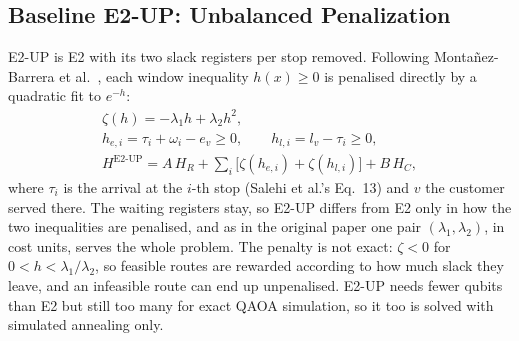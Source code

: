 \subsection{Baseline E2-UP: Unbalanced Penalization}\label{sec:e2up}
E2-UP is E2 with its two slack registers per stop removed. Following Montañez-Barrera et
al.~\cite{montanezbarrera2024unbalanced}, each window inequality $h(x)\ge0$ is penalised directly
by a quadratic fit to $e^{-h}$:
\begin{gather}
  \zeta(h) = -\lambda_1 h + \lambda_2 h^2, \label{eq:up}\\
  h_{e,i} = \tau_i + \omega_i - e_{v} \ge 0, \qquad h_{l,i} = l_{v} - \tau_i \ge 0, \label{eq:uph}\\
  H^{\mathrm{E2\text{-}UP}} = A\,H_R + \sum_{i}\bigl[\zeta(h_{e,i}) + \zeta(h_{l,i})\bigr] + B\,H_C, \label{eq:e2up}
\end{gather}
where $\tau_i$ is the arrival at the $i$-th stop (Salehi et al.'s Eq.~13) and $v$ the customer
served there. The waiting registers stay, so E2-UP differs from E2 only in how the two
inequalities are penalised, and as in the original paper one pair $(\lambda_1,\lambda_2)$, in
cost units, serves the whole problem. The penalty is not exact: $\zeta<0$ for
$0<h<\lambda_1/\lambda_2$, so feasible routes are rewarded according to how much slack they
leave, and an infeasible route can end up unpenalised. E2-UP needs fewer qubits than E2 but still
too many for exact QAOA simulation, so it too is solved with simulated annealing only.

